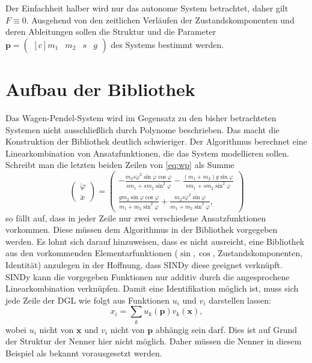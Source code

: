 Der Einfachheit halber wird nur das autonome System betrachtet, daher gilt $F\equiv0$. 
Ausgehend von den zeitlichen Verläufen der Zustandskomponenten und deren Ableitungen sollen die Struktur und die Parameter $\boldsymbol{p}=\begin{pmatrix*}[c] m_1& m_2& s & g \end{pmatrix*}$ des Systems bestimmt werden.

\section{Aufbau der Bibliothek}
\label{sec:aufbauderbibo}
Das Wagen-Pendel-System wird im Gegensatz zu den bisher betrachteten Systemen nicht ausschließlich durch Polynome beschrieben. Das macht die Konstruktion der Bibliothek deutlich schwieriger. Der Algorithmus berechnet eine Linearkombination von Ansatzfunktionen, die das System modellieren sollen. Schreibt man die letzten beiden Zeilen von \eqref{eq:wp} als Summe
\begin{equation}
	\begin{pmatrix}
		\ddot{\varphi}  \\
		\ddot{x}  	
	\end{pmatrix}
	=\begin{pmatrix}
		-\frac{m_2s\dot{\varphi}^2\sin\varphi\cos\varphi}{sm_1 + sm_2\sin^2\varphi} - \frac{(m_1+m_2)g\sin\varphi}{sm_1 + sm_2\sin^2\varphi}\\
		\frac{gm_2\sin\varphi\cos\varphi}{m_1+m_2\sin^2\varphi} + \frac{m_2s\dot{\varphi}^2\sin\varphi}{m_1+m_2\sin^2\varphi}  , 
	\end{pmatrix}		
\end{equation}
so fällt auf, dass in jeder Zeile nur zwei verschiedene Ansatzfunktionen vorkommen. Diese müssen dem Algorithmus in der Bibliothek vorgegeben werden. Es lohnt sich darauf hinzuweisen, dass es nicht ausreicht, eine Bibliothek aus den vorkommenden Elementarfunktionen ($\sin, \cos$, Zustandskomponenten, Identität) anzulegen in der Hoffnung, dass SINDy diese geeignet verknüpft. SINDy kann die vorgegeben Funktionen nur additiv durch die angesprochene Linearkombination verknüpfen. 
Damit eine Identifikation möglich ist, muss sich jede Zeile der DGL wie folgt aus Funktionen $u_i$ und $v_i$ darstellen lassen:
\begin{equation}
x_i=\sum_{k}u_k(\boldsymbol{p})v_k(\boldsymbol{x}), \label{eq:right_side_decomp}
\end{equation}
wobei $u_i$ nicht von $\boldsymbol{x}$ und $v_i$ nicht von $\boldsymbol{p}$ abhängig sein darf. Dies ist auf Grund der Struktur der Nenner hier nicht möglich. Daher müssen die Nenner in diesem Beispiel als bekannt vorausgesetzt werden. 
